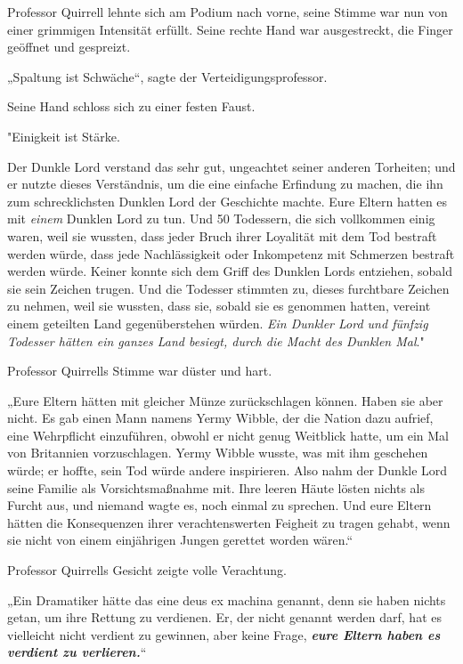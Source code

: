 {Professor Quirrell lehnte sich am Podium nach vorne, seine Stimme war nun von einer grimmigen Intensität erfüllt. Seine rechte Hand war ausgestreckt, die Finger geöffnet und gespreizt.

„Spaltung ist Schwäche“, sagte der Verteidigungsprofessor.

Seine Hand schloss sich zu einer festen Faust.

"Einigkeit ist Stärke.

Der Dunkle Lord verstand das sehr gut, ungeachtet seiner anderen Torheiten; und er nutzte dieses Verständnis, um die eine einfache Erfindung zu machen, die ihn zum schrecklichsten Dunklen Lord der Geschichte machte. Eure Eltern hatten es mit \emph{einem} Dunklen Lord zu tun. Und 50 Todessern, die sich vollkommen einig waren, weil sie wussten, dass jeder Bruch ihrer Loyalität mit dem Tod bestraft werden würde, dass jede Nachlässigkeit oder Inkompetenz mit Schmerzen bestraft werden würde. Keiner konnte sich dem Griff des Dunklen Lords entziehen, sobald sie sein Zeichen trugen. Und die Todesser stimmten zu, dieses furchtbare Zeichen zu nehmen, weil sie wussten, dass sie, sobald sie es genommen hatten, vereint einem geteilten Land gegenüberstehen würden. \emph{Ein Dunkler Lord und fünfzig Todesser hätten ein ganzes Land besiegt, durch die Macht des Dunklen Mal}."

Professor Quirrells Stimme war düster und hart.

„Eure Eltern hätten mit gleicher Münze zurückschlagen können. Haben sie aber nicht. Es gab einen Mann namens Yermy Wibble, der die Nation dazu aufrief, eine Wehrpflicht einzuführen, obwohl er nicht genug Weitblick hatte, um ein Mal von Britannien vorzuschlagen. Yermy Wibble wusste, was mit ihm geschehen würde; er hoffte, sein Tod würde andere inspirieren. Also nahm der Dunkle Lord seine Familie als Vorsichtsmaßnahme mit. Ihre leeren Häute lösten nichts als Furcht aus, und niemand wagte es, noch einmal zu sprechen. Und eure Eltern hätten die Konsequenzen ihrer verachtenswerten Feigheit zu tragen gehabt, wenn sie nicht von einem einjährigen Jungen gerettet worden wären.“

Professor Quirrells Gesicht zeigte volle Verachtung.

„Ein Dramatiker hätte das eine deus ex machina genannt, denn sie haben nichts getan, um ihre Rettung zu verdienen. Er, der nicht genannt werden darf, hat es vielleicht nicht verdient zu gewinnen, aber keine Frage, \textbf{\emph{eure Eltern haben es verdient zu verlieren.}}“

}
